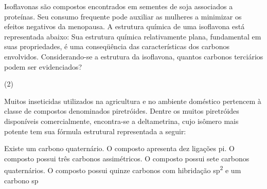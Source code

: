 \documentclass[10pt]{scrartcl}
\begin{document}
\begin{exercise}[points=1]
Isoflavonas são compostos encontrados em sementes de soja associados a proteínas. Seu consumo
frequente pode auxiliar as mulheres a minimizar os efeitos negativos da menopausa. A estrutura química de uma isoflavona está representada abaixo: Sua estrutura química relativamente plana, fundamental em suas propriedades, é uma conseqüência das características dos carbonos envolvidos.
Considerando-se a estrutura da isoflavona, quantos carbonos terciários podem ser evidenciados?


\begin{choice}(2)
\end{choice}
\end{exercise}

\begin{solution}

\end{solution}






\begin{exercise}[points=1]
Muitos inseticidas utilizados na agricultura e no ambiente doméstico pertencem à classe de compostos denominados piretróides. Dentre os muitos piretróides disponíveis comercialmente, encontra-se a deltametrina, cujo isômero mais potente tem sua fórmula estrutural representada a seguir:


\begin{choice}
\choice Existe um carbono quaternário.
\choice O composto apresenta dez ligações pi. 
\choice O composto possui três carbonos assimétricos.
\choice O composto possui sete carbonos quaternários.
\choice O composto possui quinze carbonos com hibridação sp\textsuperscript{2} e um carbono sp
\end{choice}
\end{exercise}
\begin{solution}

\end{solution}
\end{document}

